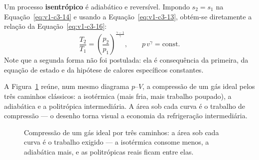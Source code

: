 \documentclass[12pt,a4paper]{article}
\numberwithin{equation}{section}
\numberwithin{table}{section}
\numberwithin{figure}{section}
\begin{document}
Um processo \textbf{isentrópico} é adiabático e reversível. Impondo
$s_2 = s_1$ na Equação~\eqref{eq:v1-c3-14} e usando a
Equação~\eqref{eq:v1-c3-13}, obtém-se diretamente a relação da
Equação~\eqref{eq:v1-c3-16}:
\begin{equation}\label{eq:v1-c3-16}
\frac{T_2}{T_1} = \left(\frac{p_2}{p_1}\right)^{\frac{\gamma-1}{\gamma}},
\qquad
p\,v^{\gamma} = \text{const.}
\end{equation}
Note que a segunda forma não foi postulada: ela é consequência da primeira, da
equação de estado e da hipótese de calores específicos constantes.

A Figura~\ref{fig:v1-c3-3} reúne, num mesmo diagrama $p$--$V$, a compressão
de um gás ideal pelos três caminhos clássicos: a isotérmica (mais fria, mais
trabalho poupado), a adiabática e a politrópica intermediária. A área sob
cada curva é o trabalho de compressão --- o desenho torna visual a
economia da refrigeração intermediária.

\begin{figure}[H]
\centering
{}
\caption[Compressão isotérmica, politrópica e adiabática no diagrama $p$--$V$.]{%
Compressão de um gás ideal por três caminhos: a área sob cada curva é o
trabalho exigido --- a isotérmica consome menos, a adiabática mais, e as
politrópicas reais ficam entre elas.}
\label{fig:v1-c3-3}
\end{figure}
\end{document}
